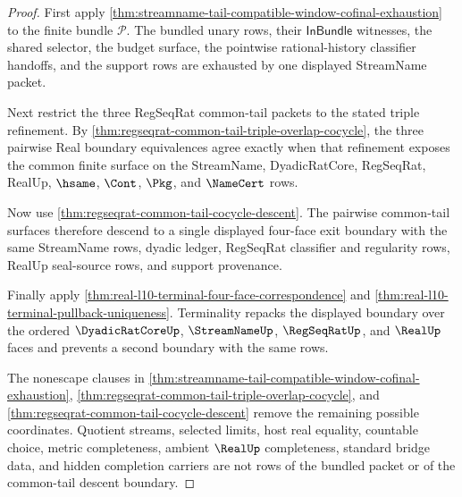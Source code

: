 \begin{proof}
First apply \autoref{thm:streamname-tail-compatible-window-cofinal-exhaustion} to the finite bundle $\mathcal P$. The bundled unary rows, their $\mathsf{InBundle}$ witnesses, the shared selector, the budget surface, the pointwise rational-history classifier handoffs, and the support rows are exhausted by one displayed StreamName packet.

Next restrict the three RegSeqRat common-tail packets to the stated triple refinement. By \autoref{thm:regseqrat-common-tail-triple-overlap-cocycle}, the three pairwise Real boundary equivalences agree exactly when that refinement exposes the common finite surface on the StreamName, DyadicRatCore, RegSeqRat, RealUp, $\hsame$, $\Cont$, $\Pkg$, and $\NameCert$ rows.

Now use \autoref{thm:regseqrat-common-tail-cocycle-descent}. The pairwise common-tail surfaces therefore descend to a single displayed four-face exit boundary with the same StreamName rows, dyadic ledger, RegSeqRat classifier and regularity rows, RealUp seal-source rows, and support provenance.

Finally apply \autoref{thm:real-l10-terminal-four-face-correspondence} and \autoref{thm:real-l10-terminal-pullback-uniqueness}. Terminality repacks the displayed boundary over the ordered $\DyadicRatCoreUp$, $\StreamNameUp$, $\RegSeqRatUp$, and $\RealUp$ faces and prevents a second boundary with the same rows.

The nonescape clauses in \autoref{thm:streamname-tail-compatible-window-cofinal-exhaustion}, \autoref{thm:regseqrat-common-tail-triple-overlap-cocycle}, and \autoref{thm:regseqrat-common-tail-cocycle-descent} remove the remaining possible coordinates. Quotient streams, selected limits, host real equality, countable choice, metric completeness, ambient $\RealUp$ completeness, standard bridge data, and hidden completion carriers are not rows of the bundled packet or of the common-tail descent boundary.
\end{proof}

